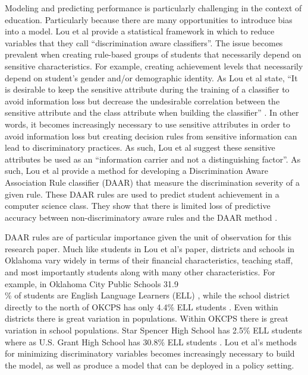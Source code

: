 \documentclass[12pt,a4paper]{article}
\begin{document}
Modeling and predicting performance is particularly challenging in the context of education. Particularly because there are many opportunities to introduce bias into a model. Lou et al provide a statistical framework in which to reduce variables that they call “discrimination aware classifiers”. The issue becomes prevalent when creating rule-based groups of students that necessarily depend on sensitive characteristics. For example, creating achievement levels that necessarily depend on student’s gender and/or demographic identity. As Lou et al state, “It is desirable to keep the sensitive attribute during the training of a classifier to avoid information loss but decrease the undesirable correlation between the sensitive attribute and the class attribute when building the classifier” \cite{luo}. In other words, it becomes increasingly necessary to use sensitive attributes in order to avoid information loss but creating decision rules from sensitive information can lead to discriminatory practices. As such, Lou et al suggest these sensitive attributes be used as an “information carrier and not a distinguishing factor”.  As such, Lou et al provide a method for developing a Discrimination Aware Association Rule classifier (DAAR) that measure the discrimination severity of a given rule. These DAAR rules are used to predict student achievement in a computer science class. They show that there is limited loss of predictive accuracy between non-discriminatory aware rules and the DAAR method \cite{luo}.

DAAR rules are of particular importance given the unit of observation for this research paper. Much like students in Lou et al’s paper, districts and schools in Oklahoma vary widely in terms of their financial characteristics, teaching staff, and most importantly students along with many other characteristics. For example, in Oklahoma City Public Schools 31.9\\\% of students are English Language Learners (ELL) \cite{okcps}  , while the school district directly to the north of OKCPS has only 4.4\% ELL students \cite{edmond}. Even within districts there is great variation in populations. Within OKCPS there is great variation in school populations. Star Spencer High School has 2.5\% ELL \cite{starspencer}students where as U.S. Grant High School has 30.8\% ELL students \cite{grant}. Lou et al’s methods for minimizing discriminatory variables becomes increasingly necessary to build the model, as well as produce a model that can be deployed in a policy setting. 
\end{document}
